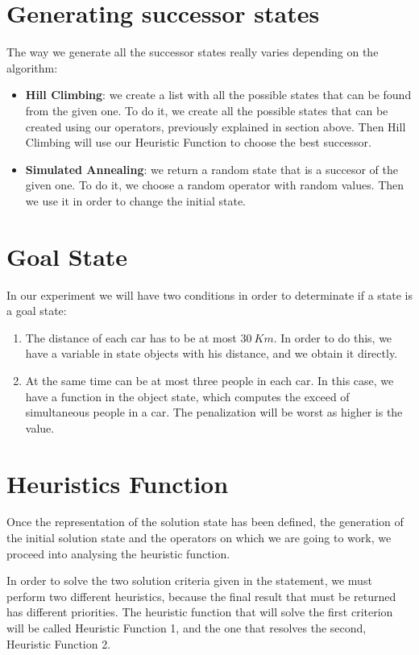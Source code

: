 \documentclass[12]{article}
\begin{document}
\section{Generating successor states}
The way we generate all the successor states really varies depending on the algorithm:
\begin{itemize}
\item \textbf{Hill Climbing}: we create a list with all the possible states that can be found from the given one. To do it, we create all the possible states that can be created using our operators, previously explained in section above. Then Hill Climbing will use our Heuristic Function to choose the best successor.
\item \textbf{Simulated Annealing}: we return a random state that is a succesor of the given one. To do it, we choose a random operator with random values. Then we use it in order to change the initial state.  
\end{itemize}

\section{Goal State}

In our experiment we will have two conditions in order to determinate if a state is a goal state:

\begin{enumerate}
  \item The distance of each car has to be at most $30\ Km$. In order to do this, we have a variable in state objects with his distance, and we obtain it directly.
  \item At the same time can be at most three people in each car. In this case, we have a function in the object state, which computes the exceed of simultaneous people in a car. The penalization will be worst as higher is the value.
\end{enumerate}

\section{Heuristics Function} \label{heuristics}
Once the representation of the solution state has been defined, the generation of the initial solution state and the operators on which we are going to work, we proceed into analysing the heuristic function. 

In order to solve the two solution criteria given in the statement, we must perform two different heuristics, because the final result that must be returned has different priorities. The heuristic function that will solve the first criterion will be called Heuristic Function 1, and the one that resolves the second, Heuristic Function 2. 
\end{document}
